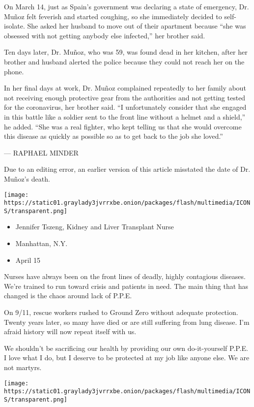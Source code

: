 On March 14, just as Spain's government was declaring a state of
emergency, Dr. Muñoz felt feverish and started coughing, so she
immediately decided to self-isolate. She asked her husband to move out
of their apartment because ``she was obsessed with not getting anybody
else infected,'' her brother said.

Ten days later, Dr. Muñoz, who was 59, was found dead in her kitchen,
after her brother and husband alerted the police because they could not
reach her on the phone.

In her final days at work, Dr. Muñoz complained repeatedly to her family
about not receiving enough protective gear from the authorities and not
getting tested for the coronavirus, her brother said. ``I unfortunately
consider that she engaged in this battle like a soldier sent to the
front line without a helmet and a shield,'' he added. ``She was a real
fighter, who kept telling us that she would overcome this disease as
quickly as possible so as to get back to the job she loved.''

--- RAPHAEL MINDER

Due to an editing error, an earlier version of this article misstated
the date of Dr. Muñoz's death.

\texttt{[image: https://static01.graylady3jvrrxbe.onion/packages/flash/multimedia/ICONS/transparent.png]}

\begin{itemize}
\tightlist
\item
  Jennifer Tszeng, Kidney and Liver Transplant Nurse
\item
  Manhattan, N.Y.
\item
  April 15
\end{itemize}

Nurses have always been on the front lines of deadly, highly contagious
diseases. We're trained to run toward crisis and patients in need. The
main thing that has changed is the chaos around lack of P.P.E.

On 9/11, rescue workers rushed to Ground Zero without adequate
protection. Twenty years later, so many have died or are still suffering
from lung disease. I'm afraid history will now repeat itself with us.

We shouldn't be sacrificing our health by providing our own
do-it-yourself P.P.E. I love what I do, but I deserve to be protected at
my job like anyone else. We are not martyrs.

\texttt{[image: https://static01.graylady3jvrrxbe.onion/packages/flash/multimedia/ICONS/transparent.png]}

